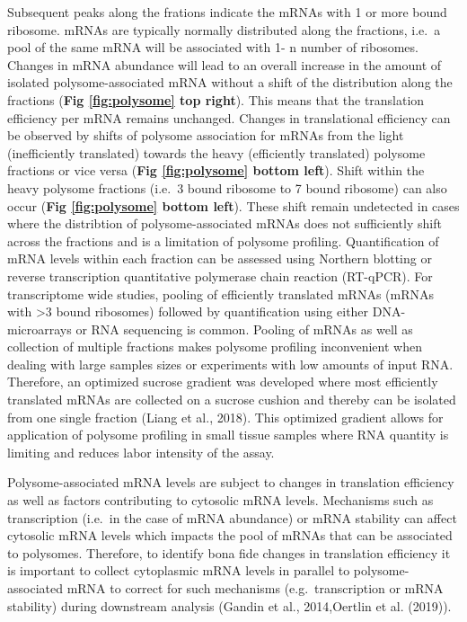 \documentclass[12pt,openany]{book}
\begin{document}
Subsequent peaks along the frations indicate the mRNAs with 1 or more
bound ribosome. mRNAs are typically normally distributed along the
fractions, i.e.~a pool of the same mRNA will be associated with 1- n
number of ribosomes. Changes in mRNA abundance will lead to an overall
increase in the amount of isolated polysome-associated mRNA without a
shift of the distribution along the fractions (\textbf{Fig
\ref{fig:polysome} top right}). This means that the translation
efficiency per mRNA remains unchanged. Changes in translational
efficiency can be observed by shifts of polysome association for mRNAs
from the light (inefficiently translated) towards the heavy (efficiently
translated) polysome fractions or vice versa (\textbf{Fig
\ref{fig:polysome} bottom left}). Shift within the heavy polysome
fractions (i.e.~3 bound ribosome to 7 bound ribosome) can also occur
(\textbf{Fig \ref{fig:polysome} bottom left}). These shift remain
undetected in cases where the distribtion of polysome-associated mRNAs
does not sufficiently shift across the fractions and is a limitation of
polysome profiling. Quantification of mRNA levels within each fraction
can be assessed using Northern blotting or reverse transcription
quantitative polymerase chain reaction (RT-qPCR). For transcriptome wide
studies, pooling of efficiently translated mRNAs (mRNAs with
\textgreater{}3 bound ribosomes) followed by quantification using either
DNA-microarrays or RNA sequencing is common. Pooling of mRNAs as well as
collection of multiple fractions makes polysome profiling inconvenient
when dealing with large samples sizes or experiments with low amounts of
input RNA. Therefore, an optimized sucrose gradient was developed where
most efficiently translated mRNAs are collected on a sucrose cushion and
thereby can be isolated from one single fraction (Liang et al., 2018).
This optimized gradient allows for application of polysome profiling in
small tissue samples where RNA quantity is limiting and reduces labor
intensity of the assay.

Polysome-associated mRNA levels are subject to changes in translation
efficiency as well as factors contributing to cytosolic mRNA levels.
Mechanisms such as transcription (i.e.~in the case of mRNA abundance) or
mRNA stability can affect cytosolic mRNA levels which impacts the pool
of mRNAs that can be associated to polysomes. Therefore, to identify
bona fide changes in translation efficiency it is important to collect
cytoplasmic mRNA levels in parallel to polysome-associated mRNA to
correct for such mechanisms (e.g.~transcription or mRNA stability)
during downstream analysis (Gandin et al., 2014,Oertlin et al. (2019)).
\end{document}
